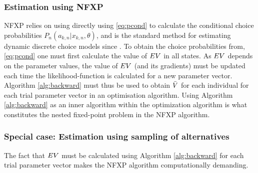\subsubsection{Estimation using NFXP}
NFXP relies on using directly using \eqref{eq:pcond} to calculate the conditional choice probabilities $P_n(a_{k,n}|x_{k,n},\theta)$, and is the standard method for estimating dynamic discrete choice models since \citet{Rust87}. To obtain the choice probabilities from, \eqref{eq:pcond} one must first calculate the value of $EV$ in all states. As $EV$ depends on the parameter values, the value of $EV$ (and its gradients) must be updated each time the likelihood-function is calculated for a new parameter vector. Algorithm \ref{alg:backward} must thus be used to obtain $\bar{V}$ for each individual for each trial parameter vector in an optimisation algorithm. Using Algorithm \ref{alg:backward} as an inner algorithm within the optimization algorithm is what constitutes the nested fixed-point problem in the NFXP algorithm. 
\subsubsection{Special case: Estimation using sampling of alternatives}
\label{sec:estSampling}

% 
The fact that $EV$ must be calculated using Algorithm \ref{alg:backward} for each trial parameter vector makes the NFXP algorithm computationally demanding. 

